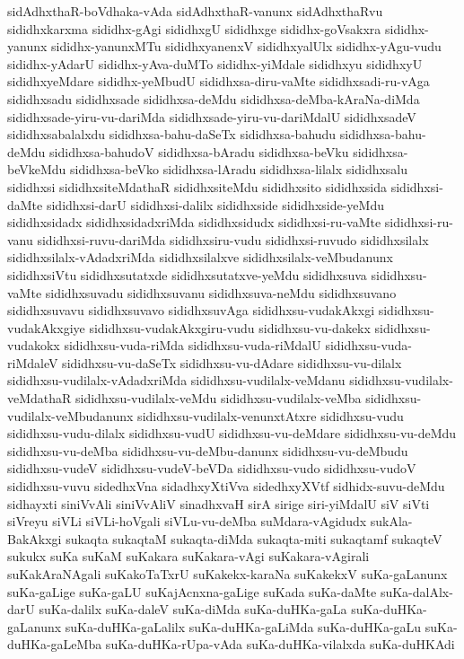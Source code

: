 {sidAdhxthaR-boVdhaka-vAda
sidAdhxthaR-vanunx
sidAdhxthaRvu
sididhxkarxma
sididhx-gAgi
sididhxgU
sididhxge
sididhx-goVsakxra
sididhx-yanunx
sididhx-yanunxMTu
sididhxyanenxV
sididhxyalUlx
sididhx-yAgu-vudu
sididhx-yAdarU
sididhx-yAva-duMTo
sididhx-yiMdale
sididhxyu
sididhxyU
sididhxyeMdare
sididhx-yeMbudU
sididhxsa-diru-vaMte
sididhxsadi-ru-vAga
sididhxsadu
sididhxsade
sididhxsa-deMdu
sididhxsa-deMba-kAraNa-diMda
sididhxsade-yiru-vu-dariMda
sididhxsade-yiru-vu-dariMdalU
sididhxsadeV
sididhxsabalalxdu
sididhxsa-bahu-daSeTx
sididhxsa-bahudu
sididhxsa-bahu-deMdu
sididhxsa-bahudoV
sididhxsa-bAradu
sididhxsa-beVku
sididhxsa-beVkeMdu
sididhxsa-beVko
sididhxsa-lAradu
sididhxsa-lilalx
sididhxsalu
sididhxsi
sididhxsiteMdathaR
sididhxsiteMdu
sididhxsito
sididhxsida
sididhxsi-daMte
sididhxsi-darU
sididhxsi-dalilx
sididhxside
sididhxside-yeMdu
sididhxsidadx
sididhxsidadxriMda
sididhxsidudx
sididhxsi-ru-vaMte
sididhxsi-ru-vanu
sididhxsi-ruvu-dariMda
sididhxsiru-vudu
sididhxsi-ruvudo
sididhxsilalx
sididhxsilalx-vAdadxriMda
sididhxsilalxve
sididhxsilalx-veMbudanunx
sididhxsiVtu
sididhxsutatxde
sididhxsutatxve-yeMdu
sididhxsuva
sididhxsu-vaMte
sididhxsuvadu
sididhxsuvanu
sididhxsuva-neMdu
sididhxsuvano
sididhxsuvavu
sididhxsuvavo
sididhxsuvAga
sididhxsu-vudakAkxgi
sididhxsu-vudakAkxgiye
sididhxsu-vudakAkxgiru-vudu
sididhxsu-vu-dakekx
sididhxsu-vudakokx
sididhxsu-vuda-riMda
sididhxsu-vuda-riMdalU
sididhxsu-vuda-riMdaleV
sididhxsu-vu-daSeTx
sididhxsu-vu-dAdare
sididhxsu-vu-dilalx
sididhxsu-vudilalx-vAdadxriMda
sididhxsu-vudilalx-veMdanu
sididhxsu-vudilalx-veMdathaR
sididhxsu-vudilalx-veMdu
sididhxsu-vudilalx-veMba
sididhxsu-vudilalx-veMbudanunx
sididhxsu-vudilalx-venunxtAtxre
sididhxsu-vudu
sididhxsu-vudu-dilalx
sididhxsu-vudU
sididhxsu-vu-deMdare
sididhxsu-vu-deMdu
sididhxsu-vu-deMba
sididhxsu-vu-deMbu-danunx
sididhxsu-vu-deMbudu
sididhxsu-vudeV
sididhxsu-vudeV-beVDa
sididhxsu-vudo
sididhxsu-vudoV
sididhxsu-vuvu
sidedhxVna
sidadhxyXtiVva
sidedhxyXVtf
sidhidx-suvu-deMdu
sidhayxti
siniVvAli
siniVvAliV
sinadhxvaH
sirA
sirige
siri-yiMdalU
siV
siVti
siVreyu
siVLi
siVLi-hoVgali
siVLu-vu-deMba
suMdara-vAgidudx
sukAla-BakAkxgi
sukaqta
sukaqtaM
sukaqta-diMda
sukaqta-miti
sukaqtamf
sukaqteV
sukukx
suKa
suKaM
suKakara
suKakara-vAgi
suKakara-vAgirali
suKakAraNAgali
suKakoTaTxrU
suKakekx-karaNa
suKakekxV
suKa-gaLanunx
suKa-gaLige
suKa-gaLU
suKajAcnxna-gaLige
suKada
suKa-daMte
suKa-dalAlx-darU
suKa-dalilx
suKa-daleV
suKa-diMda
suKa-duHKa-gaLa
suKa-duHKa-gaLanunx
suKa-duHKa-gaLalilx
suKa-duHKa-gaLiMda
suKa-duHKa-gaLu
suKa-duHKa-gaLeMba
suKa-duHKa-rUpa-vAda
suKa-duHKa-vilalxda
suKa-duHKAdi
}
